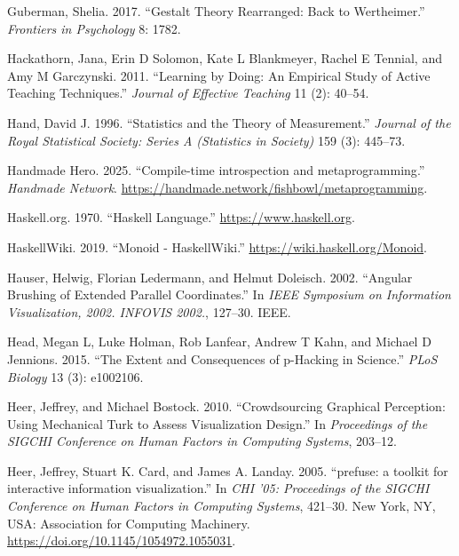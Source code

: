 \documentclass[
  openany]{book}
\newlength{\cslhangindent}
\newenvironment{CSLReferences}[2] %
 {\begin{list}{}{%
  \setlength{\itemindent}{0pt}
  \setlength{\leftmargin}{0pt}
  \setlength{\parsep}{0pt}
  \ifodd #1
   \setlength{\leftmargin}{\cslhangindent}
   \setlength{\itemindent}{-1\cslhangindent}
  \fi
  \setlength{\itemsep}{#2\baselineskip}}}
 {\end{list}}
\theoremstyle{definition}
\theoremstyle{definition}
\theoremstyle{definition}
\theoremstyle{definition}
\theoremstyle{remark}
\begin{document}
\begin{CSLReferences}{1}{0}
Guberman, Shelia. 2017. {``Gestalt Theory Rearranged: Back to Wertheimer.''} \emph{Frontiers in Psychology} 8: 1782.

Hackathorn, Jana, Erin D Solomon, Kate L Blankmeyer, Rachel E Tennial, and Amy M Garczynski. 2011. {``Learning by Doing: An Empirical Study of Active Teaching Techniques.''} \emph{Journal of Effective Teaching} 11 (2): 40--54.

Hand, David J. 1996. {``Statistics and the Theory of Measurement.''} \emph{Journal of the Royal Statistical Society: Series A (Statistics in Society)} 159 (3): 445--73.

Handmade Hero. 2025. {``{Compile-time introspection and metaprogramming}.''} \emph{Handmade Network}. \url{https://handmade.network/fishbowl/metaprogramming}.

Haskell.org. 1970. {``{Haskell Language}.''} \url{https://www.haskell.org}.

HaskellWiki. 2019. {``{Monoid - HaskellWiki}.''} \url{https://wiki.haskell.org/Monoid}.

Hauser, Helwig, Florian Ledermann, and Helmut Doleisch. 2002. {``Angular Brushing of Extended Parallel Coordinates.''} In \emph{IEEE Symposium on Information Visualization, 2002. INFOVIS 2002.}, 127--30. IEEE.

Head, Megan L, Luke Holman, Rob Lanfear, Andrew T Kahn, and Michael D Jennions. 2015. {``The Extent and Consequences of p-Hacking in Science.''} \emph{PLoS Biology} 13 (3): e1002106.

Heer, Jeffrey, and Michael Bostock. 2010. {``Crowdsourcing Graphical Perception: Using Mechanical Turk to Assess Visualization Design.''} In \emph{Proceedings of the SIGCHI Conference on Human Factors in Computing Systems}, 203--12.

Heer, Jeffrey, Stuart K. Card, and James A. Landay. 2005. {``{prefuse: a toolkit for interactive information visualization}.''} In \emph{{CHI '05: Proceedings of the SIGCHI Conference on Human Factors in Computing Systems}}, 421--30. New York, NY, USA: Association for Computing Machinery. \url{https://doi.org/10.1145/1054972.1055031}.


\end{CSLReferences}
\end{document}
